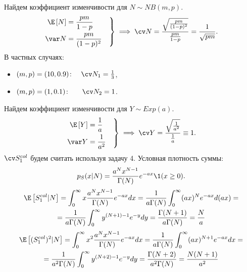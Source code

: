     \solution{}
        \partsol{}
            Найдем коэффициент изменчивости для $N\sim NB(m, p)$.
            \begin{equation*}
                \left. \begin{aligned}
                    \E \left[N\right] &= \frac{pm}{1-p} & \\
                    \var N            &= \frac{pm}{(1-p)^2} 
                \end{aligned} \right\} \implies \cv N = \frac{\sqrt{\frac{pm}{(1-p)^2} }}{\frac{pm}{1-p}} = \frac{1}{\sqrt{pm}}.
            \end{equation*}
            В частных случаях:
            \begin{itemize}
                \item $(m, p) = (10, 0.9)\colon\quad \cv N_1 = \frac{1}{3}$,
                \item $(m, p) = (1, 0.1)\colon\quad\ \ \cv N_2 = 1$.
            \end{itemize}
        \partsol{}
            Найдем коэффициент изменчивости для $Y\sim Exp(a)$.
            \begin{equation*}
                \left. \begin{aligned}
                    \E \left[Y\right] &= \frac{1}{a} & \\
                    \var Y            &= \frac{1}{a^2} 
                \end{aligned} \right\} \implies \cv Y = \frac{\sqrt{\frac{1}{a^2}}}{\frac{1}{a}} \equiv 1.
            \end{equation*}
        \partsol{}
            $\cv S_1^{col}$ будем считать используя задачу 4. Условная плотность суммы:
            \begin{equation*}
                p_S(x|N) = \frac{a^N x^{N-1}}{\Gamma(N)}e^{-ax}\1(x\geq 0).
            \end{equation*}
            \begin{multline*}
                \E\left[S_1^{col}|N\right] = \int_{0}^{\infty} x\frac{a^N x^{N-1}}{\Gamma(N)}e^{-ax}dx = 
                \frac{1}{a\Gamma(N)} \int_{0}^{\infty} (ax)^{N}e^{-ax}d(ax) =\\= \frac{1}{a\Gamma(N)} \int_{0}^{\infty} y^{(N+1)-1}e^{-y}dy = \frac{\Gamma(N+1)}{a\Gamma(N)} = \frac{N}{a}
            \end{multline*}
            \begin{multline*}
                \E\left[(S_1^{col})^2|N\right] = \int_{0}^{\infty} x^2\frac{a^N x^{N-1}}{\Gamma(N)}e^{-ax}dx = \frac{1}{a\Gamma(N)} \int_{0}^{\infty} (ax)^{N+1}e^{-ax}dx =\\=
                \frac{1}{a^2\Gamma(N)} \int_{0}^{\infty} y^{(N+2)-1}e^{-y}dy = \frac{\Gamma(N+2)}{a^2\Gamma(N)} =\frac{N(N+1)}{a^2}
            \end{multline*}
